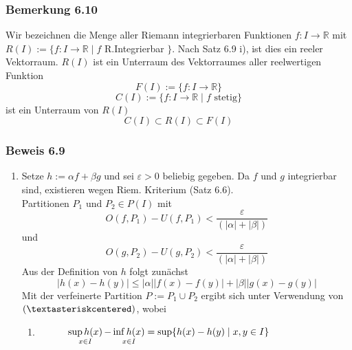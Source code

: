 \subsubsection*{Bemerkung 6.10}
Wir bezeichnen die Menge aller Riemann integrierbaren Funktionen $f:I\rightarrow \mathbb{R}$ mit $R(I):=\{f:I\rightarrow\mathbb{R}\mid f$ R.Integrierbar $\}$. Nach Satz 6.9 i), ist dies ein reeler Vektorraum. $R(I)$ ist ein Unterraum des Vektorraumes aller reelwertigen Funktion $$F(I):=\{ f:I\rightarrow \mathbb{R}\}$$$$C(I):=\{ f:I\rightarrow\mathbb{R}\mid f \text{ stetig}\}$$
ist ein Unterraum von $R(I)$ $$C(I)\subset R(I)\subset F(I)$$
\subsubsection*{Beweis 6.9}
\begin{enumerate}
\item Setze $h:=\alpha f + \beta g$ und sei $\varepsilon>0$ beliebig gegeben. Da $f$ und $g$ integrierbar sind, existieren wegen Riem. Kriterium (Satz 6.6).\\ Partitionen $P_1$ und $P_2 \in P(I)$ mit \[O(f,{P_1}) - U(f,{P_1}) < \frac{\varepsilon }{{(\left| \alpha  \right| + \left| \beta  \right|)}}\] und  \[O(g,{P_2}) - U(g,{P_2}) < \frac{\varepsilon }{{(\left| \alpha  \right| + \left| \beta  \right|)}}\] Aus der Definition von $h$ folgt zunächst \[\left| {h(x) - h(y)} \right| \le \left| \alpha  \right|\left| {f(x) - f(y)} \right| + \left| \beta  \right|\left| {g(x) - g(y)} \right|\] Mit der verfeinerte Partition $P:=P_1\cup P_2$ ergibt sich unter Verwendung von $\left( \textasteriskcentered\right)$, wobei 

\begin{enumerate}[(\textasteriskcentered)]
\item $\text{\hspace{10mm}}\mathop {\sup h(x)}\limits_{x \in I}  - \mathop {\inf h(x)}\limits_{x \in I}  = \sup \{ h(x) - h(y)\mid x,y \in I\}$ 
\end{enumerate}


\end{enumerate}

